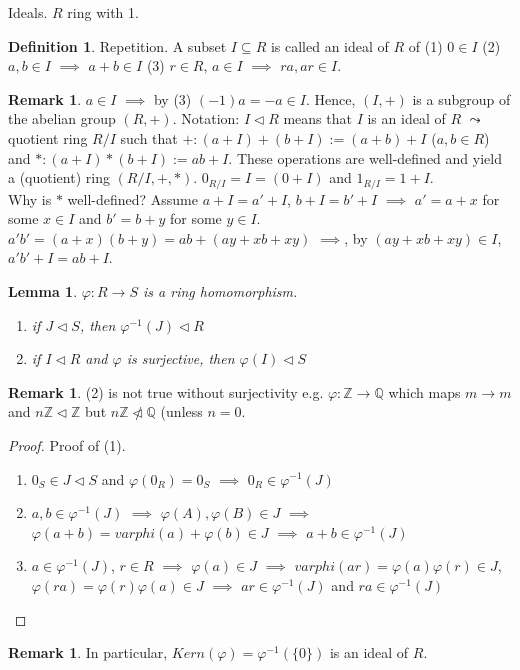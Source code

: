 \documentclass[11pt]{article}
\newtheorem{lem}[thm]{Lemma}
\theoremstyle{definition}
\newtheorem{definition}[thm]{Definition}
\newtheorem{remark}[thm]{Remark}
\numberwithin{equation}{section}
\newcommand{\Q}{\mathbb{Q}}  %
\newcommand{\Z}{\mathbb{Z}}
\begin{document}
Ideals. $R$ ring with 1.
\begin{definition}
Repetition. A subset $I \subseteq R$ is called an ideal of $R$ of (1) $0 \in I$ (2) $a, b \in I$ $\implies$ $a + b \in I$ (3) $r \in R$, $a \in I$ $\implies$ $ra, ar \in I$.
\end{definition}

\begin{remark}
$a \in I$ $\implies$ by (3) $(-1)a = -a \in I$. Hence, $(I, +)$ is a subgroup of the abelian group $(R, +)$. Notation: $I \vartriangleleft R$ means that $I$ is an ideal of $R$ $\leadsto$ quotient ring $R/I$ such that $+: (a+I) + (b+I) := (a+b) + I$ ($a, b \in R$) and $*: (a+I)*(b+I) := ab + I$. These operations are well-defined and yield a (quotient) ring $(R/I,+,*)$. $0_{R/I} = I = (0+I)$ and $1_{R/I} = 1 + I$.\\
Why is $*$ well-defined? Assume $a+I = a'+I$, $b+I = b'+I$ $\implies$ $a' = a+x$ for some $x \in I$ and $b' = b+y$ for some $y \in I$. $a'b' = (a+x)(b+y) = ab + (ay + xb + xy)$ $\implies$, by $(ay + xb + xy) \in I$, $a'b' + I = ab + I$.
\end{remark}

\begin{lem}
$\varphi: R \rightarrow S$ is a ring homomorphism.
\begin{enumerate}
    \item if $J \vartriangleleft S$, then $\varphi^{-1}(J) \vartriangleleft R$
    \item if $I \vartriangleleft R$ and $\varphi$ is surjective, then $\varphi(I) \vartriangleleft S$
\end{enumerate}
\end{lem}

\begin{remark}
(2) is not true without surjectivity e.g. $\varphi: \Z \rightarrow \Q$ which maps $m \rightarrow m$ and $n\Z \vartriangleleft \Z$ but $n\Z \ntriangleleft \Q$ (unless $n = 0$.
\end{remark}

\begin{proof}
Proof of (1).
\begin{enumerate}
    \item $0_{S} \in J \vartriangleleft S$ and $\varphi(0_{R}) = 0_{S}$ $\implies$ $0_{R} \in \varphi^{-1}(J)$
    \item $a, b \in \varphi^{-1}(J)$ $\implies$ $\varphi(A), \varphi(B) \in J$ $\implies$ $\varphi(a+b) = varphi(a) + \varphi(b) \in J$ $\implies$ $a+b \in \varphi^{-1}(J)$
    \item $a \in \varphi^{-1}(J)$, $r \in R$ $\implies$ $\varphi(a) \in J$ $\implies$ $varphi(ar) = \varphi(a)\varphi(r) \in J$, $\varphi(ra) = \varphi(r)\varphi(a) \in J$ $\implies$ $ar \in \varphi^{-1}(J)$ and $ra \in \varphi^{-1}(J)$
\end{enumerate}
\end{proof}

\begin{remark}
In particular, $Kern(\varphi) = \varphi^{-1}(\{0\})$ is an ideal of $R$.
\end{remark}
\end{document}
